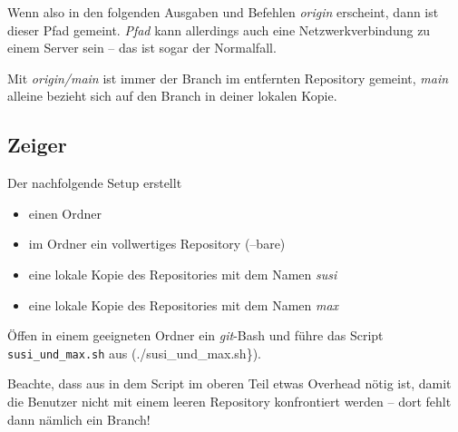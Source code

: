 \documentclass[
  letterpaper,
  DIV=11]{scrreprt}
\providecommand{\tightlist}{%
  \setlength{\itemsep}{0pt}\setlength{\parskip}{0pt}}\usepackage{longtable,booktabs,array}
\newcommand{\script}[1]{\texttt{#1}\xspace}
\newcommand{\git}{\textit{git}\xspace}
\newcommand{\branch}[1]{\textit{#1}\xspace}
\begin{document}
Wenn also in den folgenden Ausgaben und Befehlen \emph{origin}
erscheint, dann ist dieser Pfad gemeint. \emph{Pfad} kann allerdings
auch eine Netzwerkverbindung zu einem Server sein -- das ist sogar der
Normalfall.

Mit \branch{origin/main} ist immer der Branch im entfernten Repository
gemeint, \branch{main} alleine bezieht sich auf den Branch in deiner
lokalen Kopie.

\subsection{Zeiger}\label{zeiger}

Der nachfolgende Setup erstellt

\begin{itemize}
\tightlist
\item
  einen Ordner
\item
  im Ordner ein vollwertiges Repository (--bare)
\item
  eine lokale Kopie des Repositories mit dem Namen \emph{susi}
\item
  eine lokale Kopie des Repositories mit dem Namen \emph{max}
\end{itemize}

Öffen in einem geeigneten Ordner ein \git-Bash und führe das Script
\script{susi\_und\_max.sh} aus (\script{}./susi\_und\_max.sh\}).

Beachte, dass aus in dem Script im oberen Teil etwas Overhead nötig ist,
damit die Benutzer nicht mit einem leeren Repository konfrontiert werden
-- dort fehlt dann nämlich ein Branch!
\end{document}
